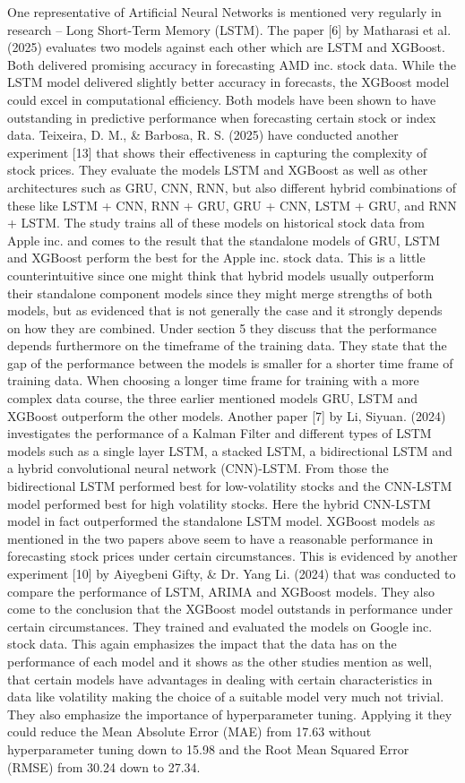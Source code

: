 \documentclass[a4paper,12pt]{report}
\begin{document}
One representative of Artificial Neural Networks is mentioned very regularly in research – Long Short-Term Memory (LSTM). The paper [6] by Matharasi et al. (2025) evaluates two models against each other which are LSTM and XGBoost. Both delivered promising accuracy in forecasting AMD inc. stock data. While the LSTM model delivered slightly better accuracy in forecasts, the XGBoost model could excel in computational efficiency. Both models have been shown to have outstanding in predictive performance when forecasting certain stock or index data. Teixeira, D. M., \& Barbosa, R. S. (2025) have conducted another experiment [13] that shows their effectiveness in capturing the complexity of stock prices. They evaluate the models LSTM and XGBoost as well as other architectures such as GRU, CNN, RNN, but also different hybrid combinations of these like LSTM + CNN, RNN + GRU, GRU + CNN, LSTM + GRU, and RNN + LSTM. The study trains all of these models on historical stock data from Apple inc. and comes to the result that the standalone models of GRU, LSTM and XGBoost perform the best for the Apple inc. stock data. This is a little counterintuitive since one might think that hybrid models usually outperform their standalone component models since they might merge strengths of both models, but as evidenced that is not generally the case and it strongly depends on how they are combined. Under section 5 they discuss that the performance depends furthermore on the timeframe of the training data. They state that the gap of the performance between the models is smaller for a shorter time frame of training data. When choosing a longer time frame for training with a more complex data course, the three earlier mentioned models GRU, LSTM and XGBoost outperform the other models. Another paper [7] by Li, Siyuan. (2024) investigates the performance of a Kalman Filter and different types of LSTM models such as a single layer LSTM, a stacked LSTM, a bidirectional LSTM and a hybrid convolutional neural network (CNN)-LSTM. From those the bidirectional LSTM performed best for low-volatility stocks and the CNN-LSTM model performed best for high volatility stocks. Here the hybrid CNN-LSTM model in fact outperformed the standalone LSTM model. XGBoost models as mentioned in the two papers above seem to have a reasonable performance in forecasting stock prices under certain circumstances. This is evidenced by another experiment [10] by Aiyegbeni Gifty, \& Dr. Yang Li. (2024) that was conducted to compare the performance of LSTM, ARIMA and XGBoost models. They also come to the conclusion that the XGBoost model outstands in performance under certain circumstances. They trained and evaluated the models on Google inc. stock data. This again emphasizes the impact that the data has on the performance of each model and it shows as the other studies mention as well, that certain models have advantages in dealing with certain characteristics in data like volatility making the choice of a suitable model very much not trivial. They also emphasize the importance of hyperparameter tuning. Applying it they could reduce the Mean Absolute Error (MAE) from 17.63 without hyperparameter tuning down to 15.98 and the Root Mean Squared Error (RMSE) from 30.24 down to 27.34.\\
\end{document}
